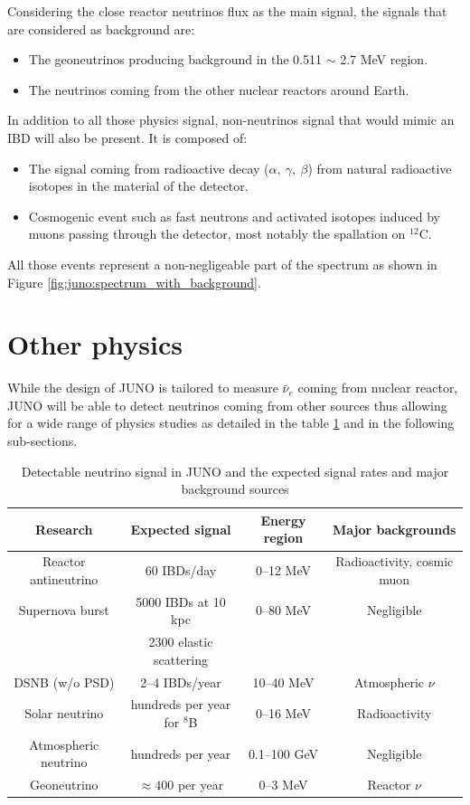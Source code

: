 \documentclass[../main.tex]{subfiles}
\begin{document}
Considering the close reactor neutrinos flux as the main signal, the signals that are considered as background are:
\begin{itemize}
  \item The geoneutrinos producing background in the 0.511 $\sim$ 2.7 MeV region.
  \item The neutrinos coming from the other nuclear reactors around Earth.
\end{itemize}
In addition to all those physics signal, non-neutrinos signal that would mimic an IBD will also be present. It is composed of:
\begin{itemize}
  \item The signal coming from radioactive decay ($\alpha, ~ \gamma, ~ \beta$) from natural radioactive isotopes in the material of the detector.
  \item Cosmogenic event such as fast neutrons and activated isotopes induced by muons passing through the detector, most notably the spallation on $^{12}$C.
\end{itemize}
All those events represent a non-negligeable part of the spectrum as shown in Figure \ref{fig:juno:spectrum_with_background}.


\section{Other physics}

While the design of JUNO is tailored to measure $\bar{\nu}_e$ coming from nuclear reactor, JUNO will be able to detect neutrinos coming from other sources thus allowing for a wide range of physics studies as detailed in the table \ref{tab:juno:signal} and in the following sub-sections.

\begin{table}[ht]
\begin{center}
  \begin{tabular}{|c|c|c|c|}
    \hline Research & Expected signal & Energy region & Major backgrounds \\
    \hline Reactor antineutrino & 60 IBDs/day & 0–12 MeV  & Radioactivity, cosmic muon \\
    Supernova burst & 5000 IBDs at 10 kpc & 0–80 MeV & Negligible \\
                    & 2300 elastic scattering  & &  \\
    DSNB (w/o PSD) & 2–4 IBDs/year & 10–40 MeV & Atmospheric $\nu$ \\
    Solar neutrino & hundreds per year for $^8$B & 0–16 MeV & Radioactivity \\
    Atmospheric neutrino & hundreds per year & 0.1–100 GeV  & Negligible \\
    Geoneutrino &  $\approx 400$ per year & 0–3 MeV & Reactor $\nu$ \\
    \hline
  \end{tabular}
  \caption{Detectable neutrino signal in JUNO and the expected signal rates and major background sources}
  \label{tab:juno:signal}
\end{center}
\end{table}
\end{document}
